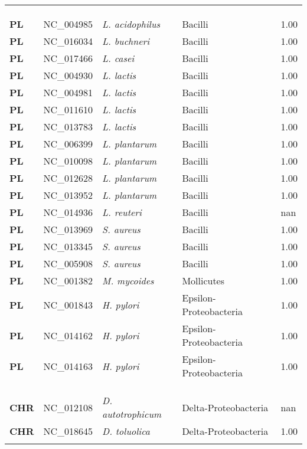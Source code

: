 \begin{adjustwidth}{-3cm}{2cm}
{\begin{supertabular}{>{\bfseries}l|p{0.1\textwidth}p{0.14\textwidth}l|l}
\\
\\
\hline\\
PL & NC\_004985 & \textit{L. acidophilus} & Bacilli & 1.00\\
PL & NC\_016034 & \textit{L. buchneri} & Bacilli & 1.00\\
PL & NC\_017466 & \textit{L. casei} & Bacilli & 1.00\\
PL & NC\_004930 & \textit{L. lactis} & Bacilli & 1.00\\
PL & NC\_004981 & \textit{L. lactis} & Bacilli & 1.00\\
PL & NC\_011610 & \textit{L. lactis} & Bacilli & 1.00\\
PL & NC\_013783 & \textit{L. lactis} & Bacilli & 1.00\\
PL & NC\_006399 & \textit{L. plantarum} & Bacilli & 1.00\\
PL & NC\_010098 & \textit{L. plantarum} & Bacilli & 1.00\\
PL & NC\_012628 & \textit{L. plantarum} & Bacilli & 1.00\\
PL & NC\_013952 & \textit{L. plantarum} & Bacilli & 1.00\\
PL & NC\_014936 & \textit{L. reuteri} & Bacilli & nan\\
PL & NC\_013969 & \textit{S. aureus} & Bacilli & 1.00\\
PL & NC\_013345 & \textit{S. aureus} & Bacilli & 1.00\\
PL & NC\_005908 & \textit{S. aureus} & Bacilli & 1.00\\
PL & NC\_001382 & \textit{M. mycoides} & Mollicutes & 1.00\\
PL & NC\_001843 & \textit{H. pylori} & Epsilon-Proteobacteria & 1.00\\
PL & NC\_014162 & \textit{H. pylori} & Epsilon-Proteobacteria & 1.00\\
PL & NC\_014163 & \textit{H. pylori} & Epsilon-Proteobacteria & 1.00\\
\\
\\
\hline\\
CHR & NC\_012108 & \textit{D. autotrophicum} & Delta-Proteobacteria & nan\\
CHR & NC\_018645 & \textit{D. toluolica} & Delta-Proteobacteria & 1.00\\
\\

\end{supertabular}}
\end{adjustwidth}
